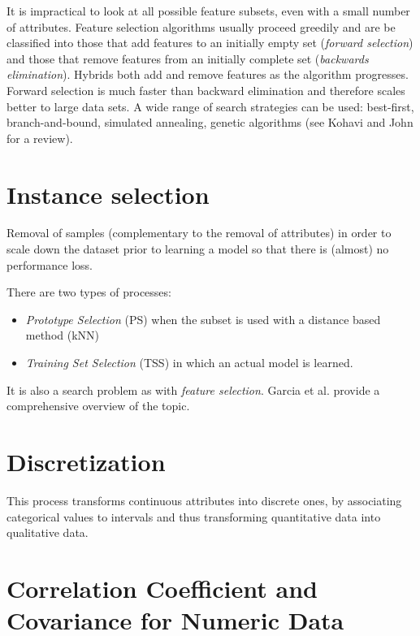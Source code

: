 \documentclass[]{book}
\begin{document}
It is impractical to look at all possible feature subsets, even with a
small number of attributes. Feature selection algorithms usually proceed
greedily and are be classified into those that add features to an
initially empty set (\emph{forward selection}) and those that remove
features from an initially complete set (\emph{backwards elimination}).
Hybrids both add and remove features as the algorithm progresses.
Forward selection is much faster than backward elimination and therefore
scales better to large data sets. A wide range of search strategies can
be used: best-first, branch-and-bound, simulated annealing, genetic
algorithms (see Kohavi and John \citeyearpar{KJ97} for a review).

\section{Instance selection}\label{instance-selection}

Removal of samples (complementary to the removal of attributes) in order
to scale down the dataset prior to learning a model so that there is
(almost) no performance loss.

There are two types of processes:

\begin{itemize}
\item
  \emph{Prototype Selection} (PS) \citep{GDCH12} when the subset is used
  with a distance based method (kNN)
\item
  \emph{Training Set Selection} (TSS) \citep{CanoHL07} in which an
  actual model is learned.
\end{itemize}

It is also a search problem as with \emph{feature selection}. Garcia et
al. \citeyearpar{GDCH12} provide a comprehensive overview of the topic.

\section{Discretization}\label{discretization}

This process transforms continuous attributes into discrete ones, by
associating categorical values to intervals and thus transforming
quantitative data into qualitative data.

\section{Correlation Coefficient and Covariance for Numeric
Data}\label{correlation-coefficient-and-covariance-for-numeric-data}
\end{document}

